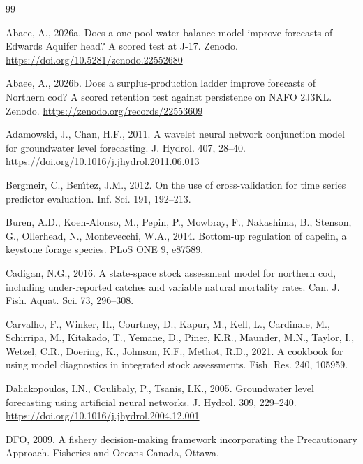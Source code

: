 \begin{thebibliography}{99}
\providecommand{\natexlab}[1]{#1}

Abaee, A., 2026a. Does a one-pool water-balance model improve forecasts of Edwards Aquifer head? A scored test at J-17. Zenodo. \url{https://doi.org/10.5281/zenodo.22552680}

Abaee, A., 2026b. Does a surplus-production ladder improve forecasts of Northern cod? A scored retention test against persistence on NAFO 2J3KL. Zenodo. \url{https://zenodo.org/records/22553609}

Adamowski, J., Chan, H.F., 2011. A wavelet neural network conjunction model for groundwater level forecasting. J. Hydrol. 407, 28--40. \url{https://doi.org/10.1016/j.jhydrol.2011.06.013}

Bergmeir, C., Ben{\'\i}tez, J.M., 2012. On the use of cross-validation for time series predictor evaluation. Inf. Sci. 191, 192--213.

Buren, A.D., Koen-Alonso, M., Pepin, P., Mowbray, F., Nakashima, B., Stenson, G., Ollerhead, N., Montevecchi, W.A., 2014. Bottom-up regulation of capelin, a keystone forage species. PLoS ONE 9, e87589.

Cadigan, N.G., 2016. A state-space stock assessment model for northern cod, including under-reported catches and variable natural mortality rates. Can. J. Fish. Aquat. Sci. 73, 296--308.

Carvalho, F., Winker, H., Courtney, D., Kapur, M., Kell, L., Cardinale, M., Schirripa, M., Kitakado, T., Yemane, D., Piner, K.R., Maunder, M.N., Taylor, I., Wetzel, C.R., Doering, K., Johnson, K.F., Methot, R.D., 2021. A cookbook for using model diagnostics in integrated stock assessments. Fish. Res. 240, 105959.

Daliakopoulos, I.N., Coulibaly, P., Tsanis, I.K., 2005. Groundwater level forecasting using artificial neural networks. J. Hydrol. 309, 229--240. \url{https://doi.org/10.1016/j.jhydrol.2004.12.001}

DFO, 2009. A fishery decision-making framework incorporating the Precautionary Approach. Fisheries and Oceans Canada, Ottawa.


\end{thebibliography}
